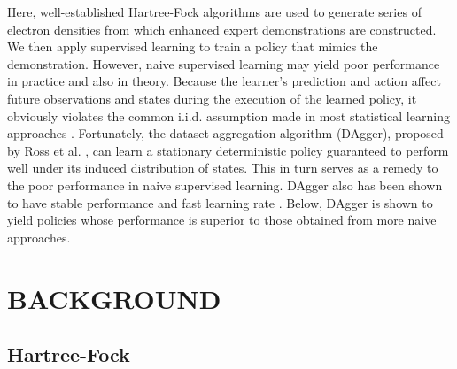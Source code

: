 \documentclass[twoside,11pt]{article}
\begin{document}
Here, well-established Hartree-Fock algorithms are used to generate series of electron densities from which enhanced expert demonstrations are constructed. We then apply supervised learning to train a policy that mimics the demonstration. However, naive supervised learning may yield poor performance in practice and also in theory.  Because the learner's prediction and action affect future observations and states during the execution of the learned policy, it obviously violates the common i.i.d. assumption made in most statistical learning approaches \citep{Ross}. Fortunately, the dataset aggregation algorithm (DAgger), proposed by Ross et al. \citep{DAgger}, can learn a stationary deterministic policy guaranteed to perform well under its induced distribution of states. This in turn serves as a remedy to the poor performance in naive supervised learning. DAgger also has been shown to have stable performance and fast learning rate \citep{DAggerCompare}. Below, DAgger is shown to yield policies whose performance is superior to those obtained from more naive approaches. 

\section{BACKGROUND}

\subsection{Hartree-Fock}
\end{document}
